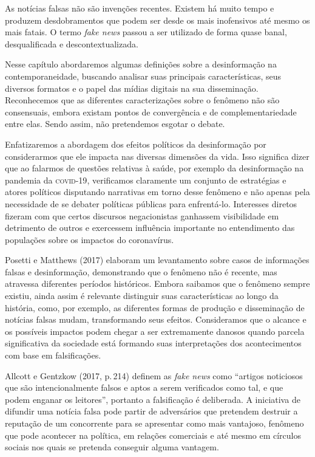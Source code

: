 As notícias falsas não são invenções recentes. Existem há muito tempo e
produzem desdobramentos que podem ser desde os mais inofensivos até
mesmo os mais fatais. O termo \textit{fake news} passou a ser utilizado de
forma quase banal, desqualificada e descontextualizada.

Nesse capítulo abordaremos algumas definições sobre a desinformação na
contemporaneidade, buscando analisar suas principais características,
seus diversos formatos e o papel das mídias digitais na sua
disseminação. Reconhecemos que as diferentes caracterizações sobre o
fenômeno não são consensuais, embora existam pontos de convergência e de
complementariedade entre elas. Sendo assim, não pretendemos esgotar o
debate.

Enfatizaremos a abordagem dos efeitos políticos da desinformação por
considerarmos que ele impacta nas diversas dimensões da vida. Isso
significa dizer que ao falarmos de questões relativas à saúde, por
exemplo da desinformação na pandemia da \textsc{covid-19}, verificamos claramente
um conjunto de estratégias e atores políticos disputando narrativas em
torno desse fenômeno e não apenas pela necessidade de se debater
políticas públicas para enfrentá-lo. Interesses diretos fizeram com que
certos discursos negacionistas ganhassem visibilidade em detrimento de
outros e exercessem influência importante no entendimento das populações
sobre os impactos do coronavírus.

Posetti e Matthews (2017) elaboram um levantamento sobre casos de
informações falsas e desinformação, demonstrando que o fenômeno não é
recente, mas atravessa diferentes períodos históricos. Embora saibamos
que o fenômeno sempre existiu, ainda assim é relevante distinguir suas
características ao longo da história, como, por exemplo, as diferentes
formas de produção e disseminação de notícias falsas mudam,
transformando seus efeitos. Consideramos que o alcance e os possíveis
impactos podem chegar a ser extremamente danosos quando parcela
significativa da sociedade está formando suas interpretações dos
acontecimentos com base em falsificações.

Allcott e Gentzkow (2017, p.\,214) definem as \textit{fake news} como ``artigos
noticiosos que são intencionalmente falsos e aptos a serem verificados
como tal, e que podem enganar os leitores'', portanto a falsificação é deliberada. A iniciativa de difundir uma
notícia falsa pode partir de adversários que pretendem destruir a
reputação de um concorrente para se apresentar como mais vantajoso,
fenômeno que pode acontecer na política, em relações comerciais e até
mesmo em círculos sociais nos quais se pretenda conseguir alguma
vantagem.

